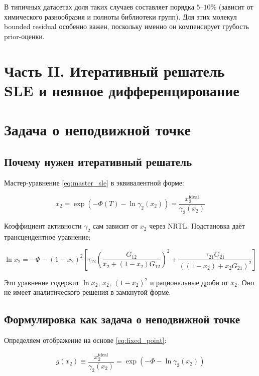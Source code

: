 \documentclass[11pt]{article}
\begin{document}
В типичных датасетах доля таких случаев составляет порядка $5$--$10\%$ (зависит от химического разнообразия и полноты библиотеки групп). Для этих молекул bounded residual особенно важен, поскольку именно он компенсирует грубость prior-оценки.


\section*{Часть II. Итеративный решатель SLE и неявное дифференцирование}

\section{Задача о неподвижной точке}

\subsection{Почему нужен итеративный решатель}

Мастер-уравнение \eqref{eq:master_sle} в эквивалентной форме:

\begin{equation}
x_2 = \exp\!\left(-\Phi(T) - \ln \gamma_2(x_2)\right) = \frac{x_2^{\mathrm{ideal}}}{\gamma_2(x_2)}
\label{eq:fixed_point}
\end{equation}

Коэффициент активности $\gamma_2$ сам зависит от $x_2$ через NRTL. Подстановка даёт трансцендентное уравнение:

\begin{equation*}
\ln x_2 = -\Phi - (1 - x_2)^2 \left[\tau_{12}\!\left(\frac{G_{12}}{x_2 + (1 - x_2)G_{12}}\right)^{2} + \frac{\tau_{21}G_{21}}{((1 - x_2) + x_2 G_{21})^2}\right]
\end{equation*}

Это уравнение содержит $\ln x_2$, $x_2$, $(1 - x_2)^2$ и рациональные дроби от $x_2$. Оно не имеет аналитического решения в замкнутой форме.

\subsection{Формулировка как задача о неподвижной точке}

Определяем отображение на основе \eqref{eq:fixed_point}:

\begin{equation*}
g(x_2) \equiv \frac{x_2^{\mathrm{ideal}}}{\gamma_2(x_2)} = \exp\!\left(-\Phi - \ln \gamma_2(x_2)\right)
\end{equation*}
\end{document}
